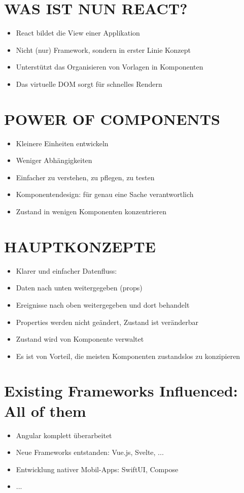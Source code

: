 \section*{WAS IST NUN REACT?}
\begin{itemize}
  \item React bildet die View einer Applikation
  \item Nicht (nur) Framework, sondern in erster Linie Konzept
  \item Unterstützt das Organisieren von Vorlagen in Komponenten
  \item Das virtuelle DOM sorgt für schnelles Rendern
\end{itemize}

\section*{POWER OF COMPONENTS}
\begin{itemize}
  \item Kleinere Einheiten entwickeln
  \item Weniger Abhängigkeiten
  \item Einfacher zu verstehen, zu pflegen, zu testen
  \item Komponentendesign: für genau eine Sache verantwortlich
  \item Zustand in wenigen Komponenten konzentrieren
\end{itemize}

\section*{HAUPTKONZEPTE}
\begin{itemize}
  \item Klarer und einfacher Datenfluss:
  \item Daten nach unten weitergegeben (props)
  \item Ereignisse nach oben weitergegeben und dort behandelt
  \item Properties werden nicht geändert, Zustand ist veränderbar
  \item Zustand wird von Komponente verwaltet
  \item Es ist von Vorteil, die meisten Komponenten zustandslos zu konzipieren
\end{itemize}

\section*{Existing Frameworks Influenced: All of them}
\begin{itemize}
  \item Angular komplett überarbeitet
  \item Neue Frameworks entstanden: Vue.js, Svelte, ...
  \item Entwicklung nativer Mobil-Apps: SwiftUI, Compose
  \item ...
\end{itemize}

